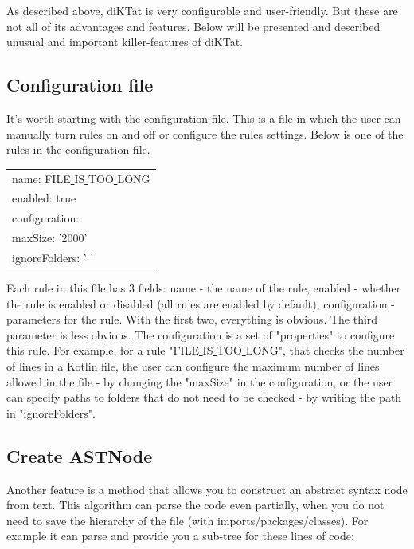 \par As described above, diKTat is very configurable and user-friendly. But these are not all of its advantages and features. Below will be presented and described unusual and important killer-features of diKTat.

\subsection{Configuration file}
\par
It's worth starting with the configuration file. This is a file in which the user can manually turn rules on and off or configure the rules settings. Below is one of the rules in the configuration file.


\begin{center}
\begin{tabular}{@{}l@{}}
 name: FILE\underline{ }IS\underline{ }TOO\underline{ }LONG\\ 
 \hspace{1cm}enabled: true\\
 \hspace{1cm}configuration:\\
 \hspace{2 cm}maxSize: '2000'\\
 \hspace{2 cm}ignoreFolders: ' '\\
\end{tabular}
\end{center}

Each rule in this file has 3 fields: name - the name of the rule, enabled - whether the rule is enabled or disabled (all rules are enabled by default), configuration - parameters for the rule. With the first two, everything is obvious. The third parameter is less obvious. The configuration is a set of "properties" to configure this rule. For example, for a rule "FILE\underline{ }IS\underline{ }TOO\underline{ }LONG", that checks the number of lines in a Kotlin file, the user can configure the maximum number of lines allowed in the file - by changing the "maxSize" in the configuration, or the user can specify paths to folders that do not need to be checked - by writing the path in "ignoreFolders". \\

\subsection{Create ASTNode}
\par
Another feature is a method that allows you to construct an abstract syntax node from text. This algorithm can parse the code even partially, when you do not need to save the hierarchy of the file (with imports/packages/classes).
For example it can parse and provide you a sub-tree for these lines of code:

